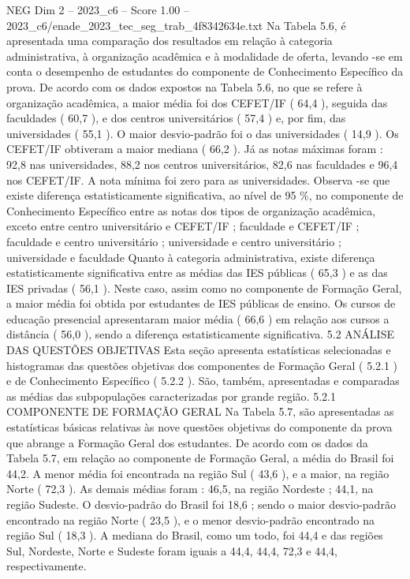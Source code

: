 \begin{textsample}{NEG Dim 2 – 2023\_c6 – Score 1.00 – 2023\_c6/enade\_2023\_tec\_seg\_trab\_4f8342634e.txt}
Na Tabela 5.6, é apresentada uma comparação dos resultados em relação à categoria administrativa, à organização acadêmica e à modalidade de oferta, levando -se em conta o desempenho de estudantes do componente de Conhecimento Específico da prova.
De acordo com os dados expostos na Tabela 5.6, no que se refere à organização acadêmica, a maior média foi dos CEFET/IF ( 64,4 ), seguida das faculdades ( 60,7 ), e dos centros universitários ( 57,4 ) e, por fim, das universidades ( 55,1 ).
O maior desvio-padrão foi o das universidades ( 14,9 ).
Os CEFET/IF obtiveram a maior mediana ( 66,2 ).
Já as notas máximas foram : 92,8 nas universidades, 88,2 nos centros universitários, 82,6 nas faculdades e 96,4 nos CEFET/IF.
A nota mínima foi zero para as universidades.
Observa -se que existe diferença estatisticamente significativa, ao nível de 95 \%, no componente de Conhecimento Específico entre as notas dos tipos de organização acadêmica, exceto entre centro universitário e CEFET/IF ; faculdade e CEFET/IF ; faculdade e centro universitário ; universidade e centro universitário ; universidade e faculdade Quanto à categoria administrativa, existe diferença estatisticamente significativa entre as médias das IES públicas ( 65,3 ) e as das IES privadas ( 56,1 ).
Neste caso, assim como no componente de Formação Geral, a maior média foi obtida por estudantes de IES públicas de ensino.
Os cursos de educação presencial apresentaram maior média ( 66,6 ) em relação aos cursos a distância ( 56,0 ), sendo a diferença estatisticamente significativa. 5.2 ANÁLISE DAS QUESTÕES OBJETIVAS Esta seção apresenta estatísticas selecionadas e histogramas das questões objetivas dos componentes de Formação Geral ( 5.2.1 ) e de Conhecimento Específico ( 5.2.2 ).
São, também, apresentadas e comparadas as médias das subpopulações caracterizadas por grande região. 5.2.1 COMPONENTE DE FORMAÇÃO GERAL Na Tabela 5.7, são apresentadas as estatísticas básicas relativas às nove questões objetivas do componente da prova que abrange a Formação Geral dos estudantes.
De acordo com os dados da Tabela 5.7, em relação ao componente de Formação Geral, a média do Brasil foi 44,2.
A menor média foi encontrada na região Sul ( 43,6 ), e a maior, na região Norte ( 72,3 ).
As demais médias foram : 46,5, na região Nordeste ; 44,1, na região Sudeste.
O desvio-padrão do Brasil foi 18,6 ; sendo o maior desvio-padrão encontrado na região Norte ( 23,5 ), e o menor desvio-padrão encontrado na região Sul ( 18,3 ).
A mediana do Brasil, como um todo, foi 44,4 e das regiões Sul, Nordeste, Norte e Sudeste foram iguais a 44,4, 44,4, 72,3 e 44,4, respectivamente.

\end{textsample}
